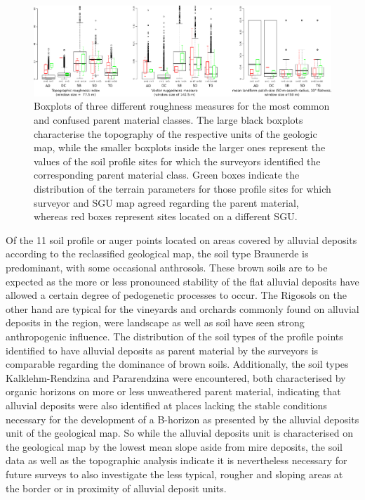 \documentclass[preprint,12pt,authoryear]{elsarticle}
\begin{document}
 \begin{figure}[ht!]
\includegraphics[width=\textwidth,angle=0]{boxplots_VR57_TRI31_MPS.pdf}
\caption{Boxplots of three different roughness measures for the most common and confused parent material classes. The large black boxplots characterise the topography of the respective units of the geologic map, while the smaller boxplots inside the larger ones represent the values of the soil profile sites for which the surveyors identified the corresponding parent material class. Green boxes indicate the distribution of the terrain parameters for those profile sites for which surveyor and SGU map agreed regarding the parent material, whereas red boxes represent sites located on a different SGU. }
\label{fig:boxplots}
\end{figure}

Of the 11 soil profile or auger points located on areas covered by alluvial deposits according to the reclassified geological map, the soil type Braunerde is predominant, with some occasional anthrosols. These brown soils are to be expected as the more or less pronounced stability of the flat alluvial deposits have allowed a certain degree of pedogenetic processes to occur. The Rigosols on the other hand are typical for the vineyards and orchards commonly found on alluvial deposits in the region, were landscape as well as soil have seen strong anthropogenic influence. The distribution of the soil types of the profile points identified to have alluvial deposits as parent material by the surveyors is comparable regarding the dominance of brown soils. Additionally, the soil types Kalklehm-Rendzina and Pararendzina were encountered, both characterised by organic horizons on more or less unweathered parent material, indicating that alluvial deposits were also identified at places lacking the stable conditions necessary for the development of a B-horizon as presented by the alluvial deposits unit of the geological map.  So while the alluvial deposits unit is characterised on the geological map by the lowest mean slope aside from mire deposits, the soil data as well as the topographic analysis indicate it is nevertheless necessary for future surveys to also investigate the less typical, rougher and sloping areas at the border or in proximity of alluvial deposit units.
\end{document}
